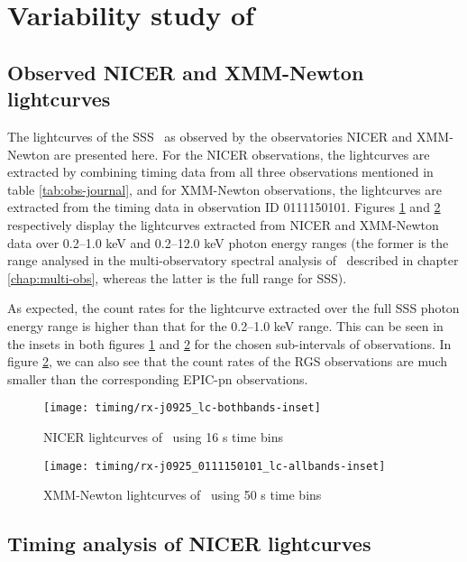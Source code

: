 	\newpage
	\section{Variability study of \source} \label{results:variability}
	
		\subsection{Observed NICER and XMM-Newton lightcurves}
			The lightcurves of the SSS \source\ as observed by the observatories NICER and XMM-Newton are presented here. For the NICER observations, the lightcurves are extracted by combining timing data from all three observations mentioned in table \ref{tab:obs-journal}, and for XMM-Newton observations, the lightcurves are extracted from the timing data in observation ID 0111150101. Figures \ref{result:lc-mrvel-nicer} and \ref{result:lc-mrvel-xmm} respectively display the lightcurves extracted from NICER and XMM-Newton data over 0.2--1.0 keV and 0.2--12.0 keV photon energy ranges (the former is the range analysed in the multi-observatory spectral analysis of \source\ described in chapter \ref{chap:multi-obs}, whereas the latter is the full range for SSS).
			
			As expected, the count rates for the lightcurve extracted over the full SSS photon energy range is higher than that for the 0.2--1.0 keV range. This can be seen in the insets in both figures \ref{result:lc-mrvel-nicer} and \ref{result:lc-mrvel-xmm} for the chosen sub-intervals of observations. In figure \ref{result:lc-mrvel-xmm}, we can also see that the count rates of the RGS observations are much smaller than the corresponding EPIC-pn observations.
			
			\begin{figure}[h!]
				\centering
				\texttt{[image: timing/rx-j0925\_lc-bothbands-inset]}
				\caption{NICER lightcurves of \source\ using 16 s time bins}
				\label{result:lc-mrvel-nicer}
			\end{figure}
			
			\begin{figure}[h!]
				\centering
				\texttt{[image: timing/rx-j0925\_0111150101\_lc-allbands-inset]}
				\caption{XMM-Newton lightcurves of \source\ using 50 s time bins}
				\label{result:lc-mrvel-xmm}
			\end{figure}
			
		\subsection{Timing analysis of NICER lightcurves}
		
